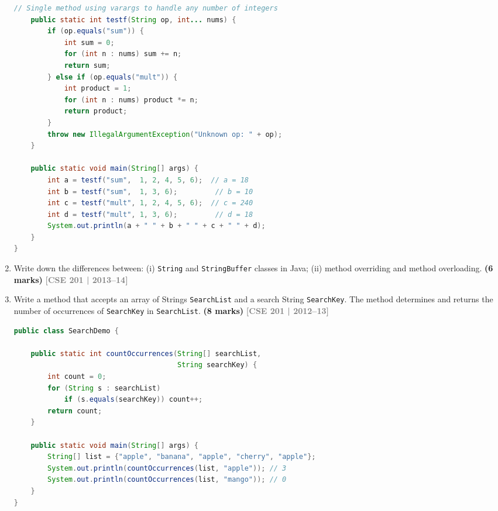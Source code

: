 \documentclass[12pt,a3paper]{article}
\newcommand{\yr}[1]{\hfill\textcolor{gray}{\small\textbf{[#1]}}}
\newcommand{\mk}[1]{\textcolor{orange!70!black}{\small\textbf{(#1 marks)}}}
\begin{document}
\begin{enumerate}
\begin{tcolorbox}[enhanced,breakable,ansbox,
  colback=cB!4,colframe=cB,boxrule=0.8pt,arc=5pt,
  title={\textbf{Answer --- \texttt{testf()} with Varargs}},
  fonttitle=\bfseries\color{white},colbacktitle=cB]
\begin{lstlisting}[language=Java]
    // Single method using varargs to handle any number of integers
    public static int testf(String op, int... nums) {
        if (op.equals("sum")) {
            int sum = 0;
            for (int n : nums) sum += n;
            return sum;
        } else if (op.equals("mult")) {
            int product = 1;
            for (int n : nums) product *= n;
            return product;
        }
        throw new IllegalArgumentException("Unknown op: " + op);
    }

    public static void main(String[] args) {
        int a = testf("sum",  1, 2, 4, 5, 6);  // a = 18
        int b = testf("sum",  1, 3, 6);         // b = 10
        int c = testf("mult", 1, 2, 4, 5, 6);  // c = 240
        int d = testf("mult", 1, 3, 6);         // d = 18
        System.out.println(a + " " + b + " " + c + " " + d);
    }
}
\end{lstlisting}

\end{tcolorbox}

\item Write down the differences between: (i) \texttt{String} and \texttt{StringBuffer} classes in Java; (ii) method overriding and method overloading. \mk{6}
\yr{CSE 201 | 2013--14}

\item Write a method that accepts an array of Strings \texttt{SearchList} and a search String \texttt{SearchKey}. The method determines and returns the number of occurrences of \texttt{SearchKey} in \texttt{SearchList}. \mk{8}
\yr{CSE 201 | 2012--13}

\begin{tcolorbox}[enhanced,breakable,ansbox,
  colback=cB!4,colframe=cB,boxrule=0.8pt,arc=5pt,
  title={\textbf{Answer --- \texttt{countOccurrences} Method}},
  fonttitle=\bfseries\color{white},colbacktitle=cB]

\begin{lstlisting}[language=Java]
public class SearchDemo {

    public static int countOccurrences(String[] searchList,
                                       String searchKey) {
        int count = 0;
        for (String s : searchList)
            if (s.equals(searchKey)) count++;
        return count;
    }

    public static void main(String[] args) {
        String[] list = {"apple", "banana", "apple", "cherry", "apple"};
        System.out.println(countOccurrences(list, "apple")); // 3
        System.out.println(countOccurrences(list, "mango")); // 0
    }
}
\end{lstlisting}


\end{tcolorbox}
\end{enumerate}
\end{document}
